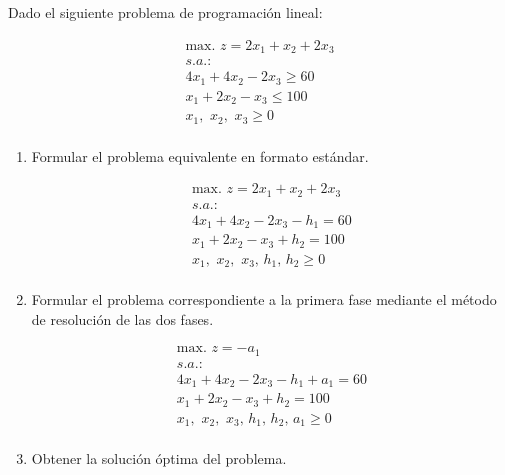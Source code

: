 Dado el siguiente problema de programación lineal:

\begin{equation}
\begin{split}
\mbox{max. } z = 2x_1 +  x_2 + 2x_3\\
s.a.:\\
4x_1 + 4x_2 - 2x_3 \geq 60\\
x_1 + 2x_2 -  x_3 \leq 100\\
x_1,\,\,x_2,\,\,x_3\geq 0\\
\end{split}
\end{equation}


\begin{enumerate}
    \item Formular el problema equivalente en formato estándar.

    \begin{equation}
    \begin{split}
    \mbox{max. } z = 2x_1 +  x_2 + 2x_3\\
    s.a.:\\
    4x_1 + 4x_2 - 2x_3 - h_1 =  60\\
    x_1 + 2x_2 -  x_3 + h_2 = 100\\
    x_1,\,\,x_2,\,\,x_3,\, h_1,\,h_2\geq 0\\
    \end{split}
    \end{equation}


    \item Formular el problema correspondiente a la primera fase mediante el método de resolución de las dos fases.

    \begin{equation}
    \begin{split}
    \mbox{max. } z = -a_1\\
    s.a.:\\
    4x_1 + 4x_2 - 2x_3 - h_1 + a_1 =  60\\
    x_1 + 2x_2 -  x_3 + h_2 = 100\\
    x_1,\,\,x_2,\,\,x_3,\, h_1,\,h_2,\, a_1 \geq 0\\
    \end{split}
    \end{equation}

\item Obtener la solución óptima del problema.



\end{enumerate}

